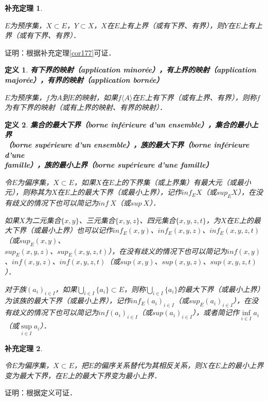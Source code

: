 \documentclass[12pt, a4paper, oneside]{book}
\newtheorem{cor}{补充定理}
\newtheorem{de}{定义}
\begin{document}
			\begin{cor}\label{cor181}
				\hfill\par
				$E$为预序集，$X\subset E$，$Y\subset X$，$X$在$E$上有上界（或有下界、有界），则$Y$在$E$上有上界（或有下界、有界）．
			\end{cor}
			证明：根据补充定理\ref{cor177}可证．

			\begin{de}
				\textbf{有下界的映射（application minorée），有上界的映射（application majorée），有界的映射（application bornée）}
				\par
				$E$为预序集，$f$为$A$到$E$的映射，如果$f\langle A \rangle $在$E$上有下界（或有上界、有界），则称$f$为有下界的映射（或有上界的映射、有界的映射）．
			\end{de}

			\begin{de}
				\textbf{集合的最大下界（borne inférieure d'un ensemble），集合的最小上界\\（borne supérieure d'un ensemble），族的最大下界（borne inférieure d'une \\famille），族的最小上界（borne supérieure d'une famille）}
				\par
				令$E$为偏序集，$X\subset E$，如果$X$在$E$上的下界集（或上界集）有最大元（或最小元），则称其为$X$在$E$上的最大下界（或最小上界），记作$inf_EX$（或$sup_EX$），在没有歧义的情况下也可以简记为$inf\ X$（或$sup\ X$）．
				\par
				如果$X$为二元集合$\{x, y\}$、三元集合$\{x, y, z\}$、四元集合$\{x, y, z, t\}$，为$X$在$E$上的最大下界（或最小上界）也可以记作$inf_E(x, y)$、$inf_E(x, y, z)$、$inf_E(x, y, z, t)$（或$sup_E(x, y)$、\\$sup_E(x, y, z)$、$sup_E(x, y, z, t)$），在没有歧义的情况下也可以简记为$inf(x, y)$、$inf(x, y, z)$、$inf(x, y, z, t)$（或$sup(x, y)$、$sup(x, y, z)$、$sup(x, y, z, t)$）．
				\par
				对于族$(a_i)_{i\in I}$，如果$\bigcup\limits_{i\in I}\{a_i\}\subset E$，则称$\bigcup\limits_{i\in I}\{a_i\}$的最大下界（或最小上界）为该族的最大下界（或最小上界），记作$inf_E(a_i)_{i\in I}$（或$sup_E(a_i)_{i\in I}$），在没有歧义的情况下也可以简记为$inf(a_i)_{i\in I}$（或$sup(a_i)_{i\in I}$），或者简记作$\mathop{inf}\limits_{i\in I}a_i$（或$\mathop{sup}\limits_{i\in I}a_i$）．
			\end{de}
			
			\begin{cor}\label{cor182}
				\hfill\par
				令$E$为偏序集，$X\subset E$，把$E$的偏序关系替代为其相反关系，则$X$在$E$上的最小上界变为最大下界，在$E$上的最大下界变为最小上界．
			\end{cor}
			证明：根据定义可证． 
\end{document}
